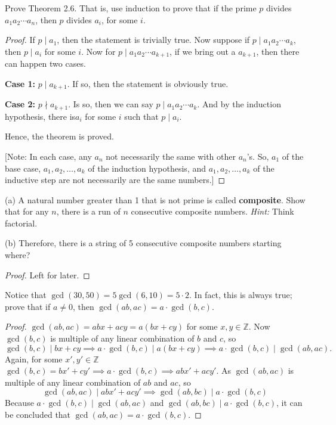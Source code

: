 \documentclass[12pt]{article}
\newenvironment{exercise}[2][Exercise]{\begin{trivlist}
\item[\hskip \labelsep {\bfseries #1}\hskip \labelsep {\bfseries #2.}]}{\end{trivlist}}
\begin{document}
\begin{exercise}{5}
Prove Theorem 2.6. That is, use induction to prove that if the prime \(p\) divides \(a_1 a_2 \cdots a_n\), then \(p\) divides \(a_i\), for some \(i\).
\end{exercise}

\begin{proof}
If $p\mid a_1$, then the statement is trivially true. Now suppose if $p\mid a_1 a_2 \cdots a_k$, then $p\mid a_i$ for some $i$. Now for $p\mid a_1 a_2 \cdots a_{k+1}$, if we bring out a $a_{k+1}$, then there can happen two cases.

\textbf{Case 1:} $p\mid a_{k+1}$. If so, then the statement is obviously true.

\textbf{Case 2:} $p\nmid a_{k+1}$. Is so, then we can say $p\mid a_1 a_2 \cdots a_k$. And by the induction hypothesis, there is$a_i$ for some $i$ such that $p\mid a_i$.

Hence, the theorem is proved.

[Note: In each case, any $a_n$ not necessarily the same with other $a_n$'s. So, $a_1$ of the base case, $a_1, a_2, \ldots ,a_k$ of the induction hypothesis, and $a_1, a_2, \ldots ,a_k$ of the inductive step are not necessarily are the same numbers.]
\end{proof}

\begin{exercise}{7}
(a) A natural number greater than 1 that is not prime is called \textbf{composite}. Show that for any \( n \), there is a run of \( n \) consecutive composite numbers. \textit{Hint:} Think factorial.

(b) Therefore, there is a string of 5 consecutive composite numbers starting where?
\end{exercise}

\begin{proof}
Left for later.
\end{proof}

\begin{exercise}{9}
    Notice that \(\gcd(30, 50) = 5 \gcd(6, 10) = 5 \cdot 2\). In fact, this is always true; prove that if \(a \neq 0\), then \(\gcd(ab, ac) = a \cdot \gcd(b, c)\).
\end{exercise}

\begin{proof}
    $\gcd(ab,ac)= abx+acy = a(bx+cy)$ for some $x, y\in \mathbb{Z}$. Now $\gcd(b,c)$ is multiple of any linear combination of $b$ and $c$, so
    $$
    \gcd(b,c) \mid bx + cy \implies a\cdot \gcd(b,c) \mid a(bx+cy) \implies a\cdot \gcd(b,c) \mid \gcd(ab,ac).
    $$
    Again, for some $x', y' \in \mathbb{Z}$  $\gcd(b,c) = bx'+cy' \implies a \cdot \gcd(b,c) \implies abx'+acy'$. As $\gcd(ab,ac)$ is multiple of any linear combination of $ab$ and $ac$, so
    \[
    \gcd(ab,ac) \mid abx'+acy' \implies \gcd(ab,bc) \mid a\cdot \gcd(b,c)
    \]
    Because $a\cdot \gcd(b,c) \mid \gcd(ab,ac)$ and $\gcd(ab,bc) \mid a\cdot \gcd(b,c)$, it can be concluded that $\gcd(ab,ac)=a\cdot \gcd(b,c)$.
\end{proof}
\end{document}
